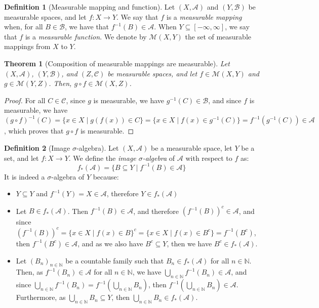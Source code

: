 \documentclass{article}
\newtheorem{theorem}{Theorem}[section]
\theoremstyle{definition}
\newtheorem{definition}{Definition}[section]
\theoremstyle{remark}
\theoremstyle{example}
\theoremstyle{notation}
\begin{document}
\begin{definition}[Measurable mapping and function]
		Let $(X, \mathcal{A})$ and $(Y, \mathcal{B})$ be measurable spaces, and let $f : X \rightarrow Y$. We say that $f$ is a \textit{measurable mapping} when, for all $B \in \mathcal{B}$, we have that $f^{-1}(B) \in \mathcal{A}$. When $Y \subseteq [-\infty, \infty]$, we say that $f$ is a \textit{measurable function}. We denote by $\mathcal{M}(X, Y)$ the set of measurable mappings from $X$ to $Y$.
\end{definition}

\begin{theorem}[Composition of measurable mappings are measurable] \label{thm:compose-measurable}
		Let $(X, \mathcal{A})$, $(Y, \mathcal{B})$, and $(Z, \mathcal{C})$ be measurable spaces, and let $f \in \mathcal{M}(X, Y)$ and $g \in \mathcal{M}(Y, Z)$. Then, $g \circ f \in \mathcal{M}(X, Z)$.
\end{theorem}

\begin{proof}
		For all $C \in \mathcal{C}$, since $g$ is measurable, we have $g^{-1}(C) \in \mathcal{B}$, and since $f$ is measurable, we have $(g \circ f)^{-1}(C) = \{x \in X \mid g(f(x)) \in C\} = \{x \in X \mid f(x) \in g^{-1}(C)\} = f^{-1}(g^{-1}(C)) \in \mathcal{A}$, which proves that $g \circ f$ is measurable.
\end{proof}

\begin{definition}[Image $\sigma$-algebra] %
		Let $(X, \mathcal{A})$ be a measurable space, let $Y$ be a set, and let $f : X \rightarrow Y$. We define the \textit{image $\sigma$-algebra} of $\mathcal{A}$ with respect to $f$ as:
				$$f_*(\mathcal{A}) = \{B \subseteq Y \mid f^{-1}(B) \in \mathcal{A}\}$$
		It is indeed a $\sigma$-algebra of $Y$ because:
		\begin{itemize}
				\item $Y \subseteq Y$ and $f^{-1}(Y) = X \in \mathcal{A}$, therefore $Y \in f_*(\mathcal{A})$
				\item Let $B \in f_*(\mathcal{A})$. Then $f^{-1}(B) \in \mathcal{A}$, and therefore $(f^{-1}(B))^c \in \mathcal{A}$, and since $(f^{-1}(B))^c = \{x \in X \mid f(x) \in B\}^c = \{x \in X \mid f(x) \in B^c\} = f^{-1}(B^c)$, then $f^{-1}(B^c) \in \mathcal{A}$, and as we also have $B^c \subseteq Y$, then we have $B^c \in f_*(\mathcal{A})$.
				\item Let $(B_n)_{n \in \mathbb{N}}$ be a countable family such that $B_n \in f_*(\mathcal{A})$ for all $n \in \mathbb{N}$. Then, as $f^{-1}(B_n) \in \mathcal{A}$ for all $n \in \mathbb{N}$, we have $\bigcup_{n \in \mathbb{N}} f^{-1}(B_n) \in \mathcal{A}$, and since $\bigcup_{n \in \mathbb{N}} f^{-1}(B_n) = f^{-1}(\bigcup_{n \in \mathbb{N}} B_n)$, then $f^{-1}(\bigcup_{n \in \mathbb{N}} B_n) \in \mathcal{A}$. Furthermore, as $\bigcup_{n \in \mathbb{N}} B_n \subseteq Y$, then $\bigcup_{n \in \mathbb{N}} B_n \in f_*(\mathcal{A})$.
		\end{itemize}
\end{definition}
\end{document}
